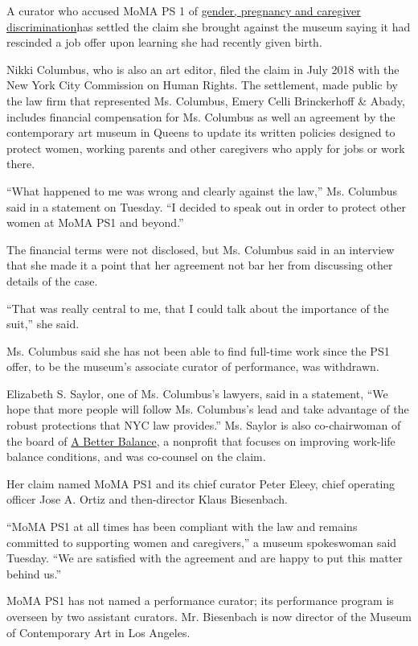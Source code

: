A curator who accused MoMA PS 1 of
\href{https://www.nytimes3xbfgragh.onion/2018/07/06/arts/design/moma-ps1-discrimination-suit-baby.html}{gender,
pregnancy and caregiver discrimination}has settled the claim she brought
against the museum saying it had rescinded a job offer upon learning she
had recently given birth.

Nikki Columbus, who is also an art editor, filed the claim in July 2018
with the New York City Commission on Human Rights. The settlement, made
public by the law firm that represented Ms. Columbus, Emery Celli
Brinckerhoff \& Abady, includes financial compensation for Ms. Columbus
as well an agreement by the contemporary art museum in Queens to update
its written policies designed to protect women, working parents and
other caregivers who apply for jobs or work there.

``What happened to me was wrong and clearly against the law,'' Ms.
Columbus said in a statement on Tuesday. ``I decided to speak out in
order to protect other women at MoMA PS1 and beyond.''

The financial terms were not disclosed, but Ms. Columbus said in an
interview that she made it a point that her agreement not bar her from
discussing other details of the case.

``That was really central to me, that I could talk about the importance
of the suit,'' she said.

Ms. Columbus said she has not been able to find full-time work since the
PS1 offer, to be the museum's associate curator of performance, was
withdrawn.

Elizabeth S. Saylor, one of Ms. Columbus's lawyers, said in a statement,
``We hope that more people will follow Ms. Columbus's lead and take
advantage of the robust protections that NYC law provides.'' Ms. Saylor
is also co-chairwoman of the board of
\href{https://www.abetterbalance.org/}{A Better Balance}, a nonprofit
that focuses on improving work-life balance conditions, and was
co-counsel on the claim.

Her claim named MoMA PS1 and its chief curator Peter Eleey, chief
operating officer Jose A. Ortiz and then-director Klaus Biesenbach.

``MoMA PS1 at all times has been compliant with the law and remains
committed to supporting women and caregivers,'' a museum spokeswoman
said Tuesday. ``We are satisfied with the agreement and are happy to put
this matter behind us.''

MoMA PS1 has not named a performance curator; its performance program is
overseen by two assistant curators. Mr. Biesenbach is now director of
the Museum of Contemporary Art in Los Angeles.

